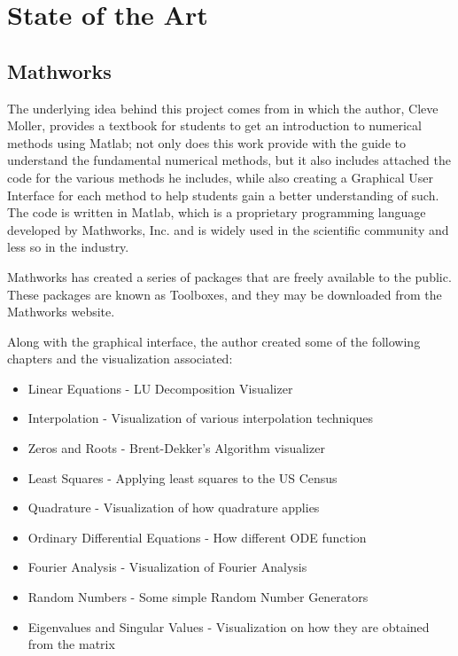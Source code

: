 \chapter{State of the Art}
\section{Mathworks}
The underlying idea behind this project comes from \cite{doi:10.1137/1.9780898717952} in which the author, Cleve Moller, provides a textbook for students to get an introduction to numerical methods using Matlab; not only does this work provide with the guide to understand the fundamental numerical methods, but it also includes attached the code for the various methods he includes, while also creating a Graphical User Interface for each method to help students gain a better understanding of such. The code is written in Matlab, which is a proprietary programming language developed by Mathworks, Inc. and is widely used in the scientific community and less so in the industry.

Mathworks has created a series of packages that are freely available to the public. These packages are known as Toolboxes, and they may be downloaded from the Mathworks website. 

Along with the graphical interface, the author created some of the following chapters and the visualization associated:
\begin{itemize}
    \item Linear Equations - LU Decomposition Visualizer
    \item Interpolation - Visualization of various interpolation techniques
    \item Zeros and Roots - Brent-Dekker's Algorithm visualizer
    \item Least Squares - Applying least squares to the US Census 
    \item Quadrature - Visualization of how quadrature applies
    \item Ordinary Differential Equations - How different ODE function
    \item Fourier Analysis - Visualization of Fourier Analysis
    \item Random Numbers - Some simple Random Number Generators
    \item Eigenvalues and Singular Values - Visualization on how they are obtained from the matrix
\end{itemize}



